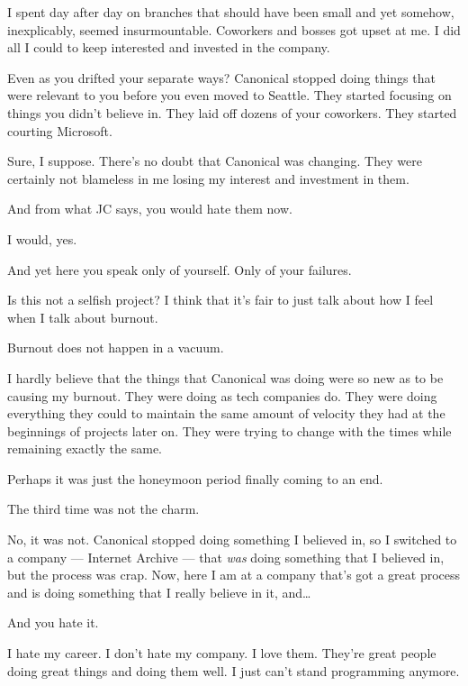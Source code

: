 \begin{paracol}{2}
\begin{leftcolumn}
I spent day after day on branches that should have been small and yet somehow, inexplicably, seemed insurmountable. Coworkers and bosses got upset at me. I did all I could to keep interested and invested in the company.

\begin{ally}
Even as you drifted your separate ways? Canonical stopped doing things that were relevant to you before you even moved to Seattle. They started focusing on things you didn't believe in. They laid off dozens of your coworkers. They started courting Microsoft.
\end{ally}
Sure, I suppose. There's no doubt that Canonical was changing. They were certainly not blameless in me losing my interest and investment in them.

\begin{ally}
And from what JC says, you would hate them now.
\end{ally}
I would, yes.

\begin{ally}
And yet here you speak only of yourself. Only of your failures.
\end{ally}
Is this not a selfish project? I think that it's fair to just talk about how I feel when I talk about burnout.

\begin{ally}
Burnout does not happen in a vacuum.
\end{ally}
I hardly believe that the things that Canonical was doing were so new as to be causing my burnout. They were doing as tech companies do. They were doing everything they could to maintain the same amount of velocity they had at the beginnings of projects later on. They were trying to change with the times while remaining exactly the same.

Perhaps it was just the honeymoon period finally coming to an end.

\newpage

\begin{ally}
The third time was not the charm.
\end{ally}
No, it was not. Canonical stopped doing something I believed in, so I switched to a company --- Internet Archive --- that \emph{was} doing something that I believed in, but the process was crap. Now, here I am at a company that's got a great process and is doing something that I really believe in it, and\ldots{}

\begin{ally}
And you hate it.
\end{ally}
I hate my career. I don't hate my company. I love them. They're great people doing great things and doing them well. I just can't stand programming anymore.


\end{leftcolumn}
\end{paracol}
